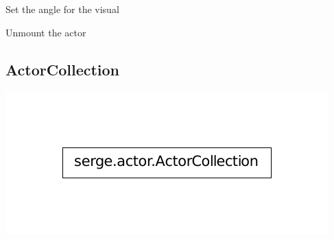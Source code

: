 \documentclass[letterpaper,10pt,english]{sphinxmanual}
\begin{document}
\begin{fulllineitems}
\begin{fulllineitems}
\end{fulllineitems}


\begin{fulllineitems}
\label{actor:serge.actor.PhysicallyMountableActor.setAngle}
Set the angle for the visual

\end{fulllineitems}


\begin{fulllineitems}
\label{actor:serge.actor.PhysicallyMountableActor.unmountActor}
Unmount the actor

\end{fulllineitems}


\end{fulllineitems}



\subsection{ActorCollection}
\label{actor:actorcollection}
\includegraphics{inheritance-af6282a721309f3c98a915ce735acd55205b815b.pdf}
\end{document}
